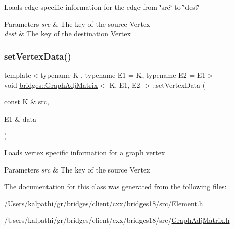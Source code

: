 Loads edge specific information for the edge from \char`\"{}src\char`\"{} to \char`\"{}dest\char`\"{}


\begin{DoxyParams}{Parameters}
{\em src} & The key of the source Vertex \\
\hline
{\em dest} & The key of the destination Vertex \\
\hline
\end{DoxyParams}
\mbox{\label{classbridges_1_1_graph_adj_matrix_a0dcc7220d850052aea47fccfd52192e0}} 
\subsubsection{\texorpdfstring{set\+Vertex\+Data()}{setVertexData()}}
{\footnotesize\ttfamily template$<$typename K , typename E1  = K, typename E2  = E1$>$ \\
void \mbox{\hyperlink{classbridges_1_1_graph_adj_matrix}{bridges\+::\+Graph\+Adj\+Matrix}}$<$ K, E1, E2 $>$\+::set\+Vertex\+Data (\begin{DoxyParamCaption}\item[{const K \&}]{src,  }\item[{E1 \&}]{data }\end{DoxyParamCaption})\hspace{0.3cm}{\ttfamily [inline]}}

Loads vertex specific information for a graph vertex


\begin{DoxyParams}{Parameters}
{\em src} & The key of the source Vertex \\
\hline
\end{DoxyParams}


The documentation for this class was generated from the following files\+:\begin{DoxyCompactItemize}
\item 
/\+Users/kalpathi/gr/bridges/client/cxx/bridges18/src/\mbox{\hyperlink{_element_8h}{Element.\+h}}\item 
/\+Users/kalpathi/gr/bridges/client/cxx/bridges18/src/\mbox{\hyperlink{_graph_adj_matrix_8h}{Graph\+Adj\+Matrix.\+h}}\end{DoxyCompactItemize}
